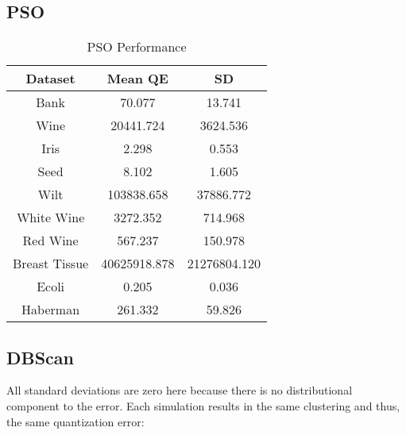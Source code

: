 \documentclass[conference]{IEEEtran}
\begin{document}
  \subsection{PSO}

  \begin{table}[h]
  \caption{PSO Performance}
  \resizebox{1.3\textwidth}{!} {\begin{minipage}{\textwidth}
      
      \begin{tabular}{ c |c | c }
        Dataset & Mean QE & SD \\ \hline
        Bank & 70.077 & 13.741 \\
        Wine & 20441.724 & 3624.536 \\
        Iris & 2.298 & 0.553 \\
        Seed & 8.102 & 1.605 \\
        Wilt & 103838.658 & 37886.772 \\
        White Wine & 3272.352 & 714.968 \\
        Red Wine & 567.237 & 150.978 \\
        Breast Tissue & 40625918.878 & 21276804.120 \\
        Ecoli & 0.205 & 0.036 \\
        Haberman & 261.332 & 59.826
      \end{tabular}

      \label{table:psoError}
  \end{minipage} }
  \end{table}

    \subsection{DBScan}
    All standard deviations are zero here because there is no distributional component to the error. Each simulation results in the same clustering and thus, the same quantization error:
    
\end{document}
